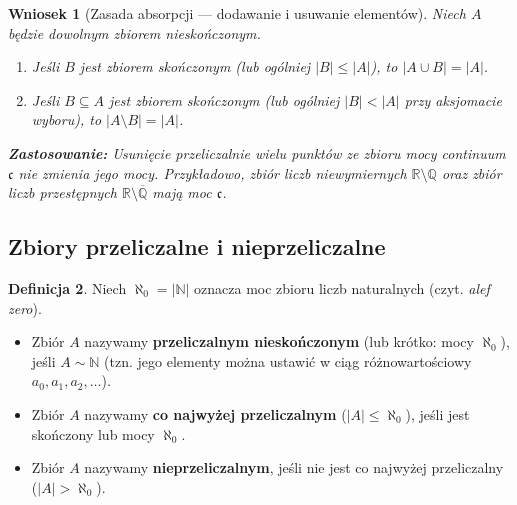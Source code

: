 \documentclass[11pt, a4paper]{article}
\theoremstyle{definition}
\newtheorem{definicja}{Definicja}[section]
\theoremstyle{plain}
\newtheorem{wniosek}[definicja]{Wniosek}
\theoremstyle{remark}
\begin{document}
\begin{wniosek}[Zasada absorpcji — dodawanie i usuwanie elementów]\label{wn:absorpcja}
Niech $A$ będzie dowolnym zbiorem nieskończonym.
\begin{enumerate}
    \item Jeśli $B$ jest zbiorem skończonym (lub ogólniej $|B| \le |A|$), to $|A \cup B| = |A|$.
    \item Jeśli $B \subseteq A$ jest zbiorem skończonym (lub ogólniej $|B| < |A|$ przy aksjomacie wyboru), to $|A \setminus B| = |A|$.
\end{enumerate}
\textbf{Zastosowanie:} Usunięcie przeliczalnie wielu punktów ze zbioru mocy continuum $\mathfrak{c}$ nie zmienia jego mocy. Przykładowo, zbiór liczb niewymiernych $\mathbb{R} \setminus \mathbb{Q}$ oraz zbiór liczb przestępnych $\mathbb{R} \setminus \overline{\mathbb{Q}}$ mają moc $\mathfrak{c}$.
\end{wniosek}

\subsection{Zbiory przeliczalne i nieprzeliczalne}

\begin{definicja}
Niech $\aleph_0 = |\mathbb{N}|$ oznacza moc zbioru liczb naturalnych (czyt. \emph{alef zero}).
\begin{itemize}
    \item Zbiór $A$ nazywamy \textbf{przeliczalnym nieskończonym} (lub krótko: mocy $\aleph_0$), jeśli $A \sim \mathbb{N}$ (tzn. jego elementy można ustawić w ciąg różnowartościowy $a_0, a_1, a_2, \dots$).
    \item Zbiór $A$ nazywamy \textbf{co najwyżej przeliczalnym} ($|A| \le \aleph_0$), jeśli jest skończony lub mocy $\aleph_0$.
    \item Zbiór $A$ nazywamy \textbf{nieprzeliczalnym}, jeśli nie jest co najwyżej przeliczalny ($|A| > \aleph_0$).
\end{itemize}
\end{definicja}
\end{document}
